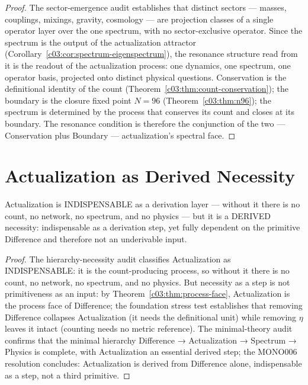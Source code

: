 \begin{proof}
The sector-emergence audit \cite{c03:QG272} establishes that distinct sectors --- masses,
couplings, mixings, gravity, cosmology --- are projection classes of a single operator layer
over the one spectrum, with no sector-exclusive operator. Since the spectrum is the output
of the actualization attractor (Corollary~\ref{c03:cor:spectrum-eigenspectrum}), the resonance
structure read from it is the readout of the actualization process: one dynamics, one
spectrum, one operator basis, projected onto distinct physical questions. Conservation is
the definitional identity of the count (Theorem~\ref{c03:thm:count-conservation}); the
boundary is the closure fixed point $N=96$ (Theorem~\ref{c03:thm:n96}); the spectrum is
determined by the process that conserves its count and closes at its boundary. The resonance
condition is therefore the conjunction of the two --- Conservation plus Boundary ---
actualization's spectral face.
\end{proof}

\section{Actualization as Derived Necessity}
\label{c03:sec:derived-necessity}

\begin{theorem}
\label{c03:thm:derived-not-primitive}
Actualization is INDISPENSABLE as a derivation layer --- without it there is no count, no
network, no spectrum, and no physics --- but it is a DERIVED necessity: indispensable as a
derivation step, yet fully dependent on the primitive Difference and therefore not an
underivable input.
\end{theorem}

\begin{proof}
The hierarchy-necessity audit \cite{c03:QG293} classifies Actualization as INDISPENSABLE: it is
the count-producing process, so without it there is no count, no network, no spectrum, and
no physics. But necessity as a step is not primitiveness as an input: by
Theorem~\ref{c03:thm:process-face}, Actualization is the process face of Difference; the
foundation stress test \cite{c03:QG292} establishes that removing Difference collapses
Actualization (it needs the definitional unit) while removing $\eta$ leaves it intact
(counting needs no metric reference). The minimal-theory audit \cite{c03:QG294} confirms that
the minimal hierarchy Difference → Actualization → Spectrum → Physics is complete, with
Actualization an essential derived step; the MONO006 resolution \cite{c03:MONO006} concludes:
Actualization is derived from Difference alone, indispensable as a step, not a third
primitive.
\end{proof}

